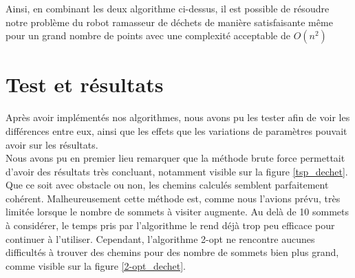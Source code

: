 \documentclass{article}
\begin{document}
  Ainsi, en combinant les deux algorithme ci-dessus, il est possible de résoudre notre problème du robot ramasseur de déchets de manière satisfaisante même pour un grand nombre de points avec une complexité acceptable de $O(n^2)$

\section {Test et résultats}

Après avoir implémentés nos algorithmes, nous avons pu les tester afin de voir les différences entre eux, ainsi que les effets que les variations de
paramètres pouvait avoir sur les résultats. \\

Nous avons pu en premier lieu remarquer que la méthode brute force permettait d'avoir des résultats très concluant, notamment visible sur la figure
\ref{tsp_dechet}. Que ce soit avec obstacle ou non, les chemins calculés semblent parfaitement cohérent.
Malheureusement cette méthode est, comme nous l'avions prévu, très limitée lorsque le nombre de sommets à visiter augmente. Au delà de 10 sommets à
considérer, le temps pris par l'algorithme le rend déjà trop peu efficace pour continuer à l'utiliser. Cependant, l'algorithme 2-opt ne rencontre
aucunes difficultés à trouver des chemins pour des nombre de sommets bien plus grand, comme visible sur la figure \ref{2-opt_dechet}. \\
\end{document}
